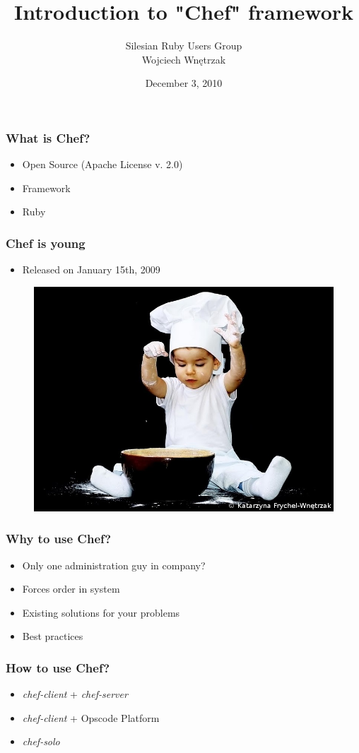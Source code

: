 \documentclass[16pt]{beamer}
\author{Silesian Ruby Users Group\\
  \footnotesize{Wojciech Wnętrzak}}
\date{December 3, 2010}
\title{Introduction to "Chef" framework}
\begin{document}
\frame{\titlepage}

\begin{frame}
  \frametitle{What is Chef?}
  \begin{itemize}
    \item Open Source (Apache License v. 2.0)
    \item Framework
    \item Ruby
  \end{itemize}
\end{frame}

\begin{frame}
  \frametitle{Chef is young}
  \begin{itemize}
    \item Released on January 15th, 2009
  \end{itemize}
  \begin{figure}
    \includegraphics[width=0.8\linewidth]{images/young-chef}
  \end{figure}
\end{frame}

\begin{frame}
  \frametitle{Why to use Chef?}
  \begin{itemize}
    \item Only one administration guy in company?
    \item Forces order in system
    \item Existing solutions for your problems
    \item Best practices
  \end{itemize}
\end{frame}

\begin{frame}
  \frametitle{How to use Chef?}
  \begin{itemize}
    \item \emph{chef-client} + \emph{chef-server}
    \item \emph{chef-client} + Opscode Platform
    \item \emph{chef-solo}
  \end{itemize}
\end{frame}
\end{document}
